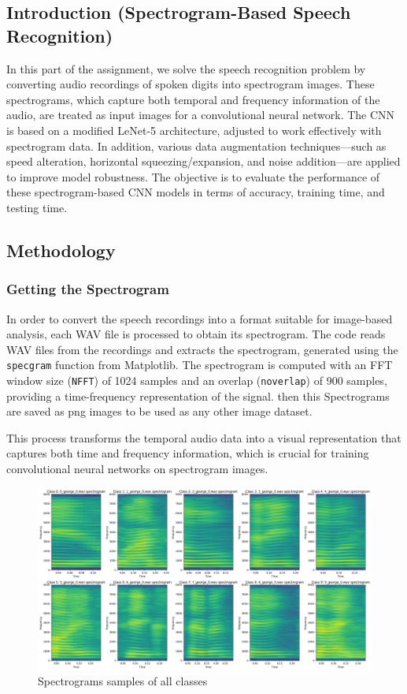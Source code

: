 \documentclass[a4paper,12pt]{article}
\begin{document}
\subsection{Introduction (Spectrogram-Based Speech Recognition)}
In this part of the assignment, we solve the speech recognition problem  by converting audio recordings of spoken digits into spectrogram images. These spectrograms, which capture both temporal and frequency information of the audio, are treated as input images for a convolutional neural network. The CNN is based on a modified LeNet-5 architecture, adjusted to work effectively with spectrogram data. In addition, various data augmentation techniques—such as speed alteration, horizontal squeezing/expansion, and noise addition—are applied to improve model robustness. The objective is to evaluate the performance of these spectrogram-based CNN models in terms of accuracy, training time, and testing time.


\subsection{Methodology}


\subsubsection{Getting the Spectrogram}
In order to convert the speech recordings into a format suitable for image-based analysis, each WAV file is processed to obtain its spectrogram. The code reads WAV files from the recordings and extracts the spectrogram, generated using the \texttt{specgram} function from Matplotlib. The spectrogram is computed with an FFT window size (\texttt{NFFT}) of 1024 samples and an overlap (\texttt{noverlap}) of 900 samples, providing a time-frequency representation of the signal. then this Spectrograms are saved as png images to be used as any other image dataset.

This process transforms the temporal audio data into a visual representation that captures both time and frequency information, which is crucial for training convolutional neural networks on spectrogram images.

\begin{figure}[H]
    \centering
    \includegraphics[width=1\textwidth]{all_spectrograms.png}
    \caption{Spectrograms samples of all classes}
    \label{fig:mlp_1_hidden}
\end{figure}
\end{document}
